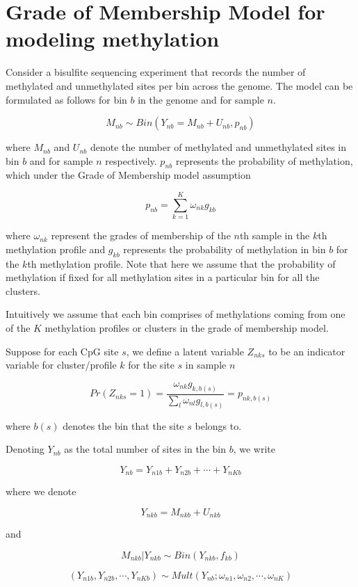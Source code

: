 \documentclass[a4paper, 12pt]{article}
\begin{document}
\section{Grade of Membership Model for modeling methylation}

Consider a bisulfite sequencing experiment that records the number of methylated and 
unmethylated sites per bin across the genome. The model can be formulated as follows for 
bin $b$ in the genome and for sample $n$.

$$ M_{nb} \sim Bin \left (Y_{nb} = M_{nb} + U_{nb} , p_{nb} \right ) $$

where $M_{nb}$ and $U_{nb}$ denote the number of methylated and unmethylated  sites 
in bin $b$ and for sample $n$ respectively. $p_{nb}$ represents the probability of methylation, which
under the Grade of Membership model assumption 

$$ p_{nb} = \sum_{k=1}^{K} \omega_{nk} g_{kb}  $$

where $\omega_{nk}$ represent the grades of membership of the $n$th sample in the $k$th methylation
profile and $g_{kb}$ represents the probability of methylation in bin $b$ for the $k$th methylation profile.
Note that here we assume that the probability of methylation if fixed for all methylation sites in a particular 
bin for all the clusters. 

Intuitively we assume that each bin comprises of  methylations coming from one of the $K$ methylation profiles 
or clusters in the grade of membership model. 

Suppose for each CpG site $s$, we define a latent variable $Z_{nks}$ to be an indicator variable for cluster/profile $k$ for the site $s$ in sample $n$

$$ Pr (Z_{nks} = 1 ) = \frac{\omega_{nk} g_{k, b(s)}}{\sum_{l} \omega_{nl} g_{l, b(s)}}  = p_{nk,b(s)}$$

where $b(s)$ denotes the bin that the site $s$ belongs to.

Denoting $Y_{nb}$ as the total number of sites in the bin $b$, we write 

$$ Y_{nb} = Y_{n1b} + Y_{n2b} + \cdots + Y_{nKb} $$

where we denote 

$$ Y_{nkb} = M_{nkb} + U_{nkb} $$

and 

$$ M_{nkb} | Y_{nkb}  \sim Bin (Y_{nkb}, f_{kb} ) $$

$$ \left( Y_{n1b}, Y_{n2b}, \cdots, Y_{nKb} \right ) \sim Mult \left (Y_{nb} ; \omega_{n1}, \omega_{n2}, \cdots, \omega_{nK} \right )  $$
\end{document}
